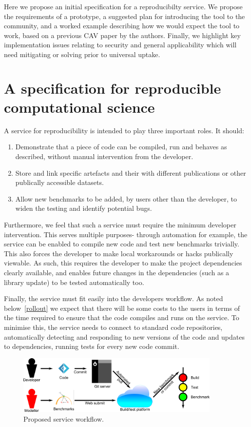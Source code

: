 \documentclass{llncs}
\begin{document}
Here we propose an initial specification for a reproducibilty service. We propose the
requirements of a prototype, a suggested plan for introducing the tool to the community,
and a worked example describing how we would expect the tool to work, based on a previous
CAV paper by the authors. Finally, we highlight key implementation issues relating to
security and general applicability which will need mitigating or solving prior to universal
uptake.

\section{A specification for reproducible computational science}\label{spec}

A service for reproducibility is intended to play three important roles. It should:
\begin{enumerate}
	\item Demonstrate that a piece of code can be compiled, run and behaves as described,
		without manual intervention from the developer.
	\item Store and link specific artefacts and their with different publications
		or other publically accessible datasets.
	\item Allow new benchmarks to be added, by users other than the developer, to 
		widen the testing and identify potential bugs.
\end{enumerate}
 
Furthermore, we feel that such a service must require the minimum developer intervention.
This serves multiple purposes- through automation for example, the service can be enabled to compile 
new code and test new benchmarks trivially. This also forces the developer to make local
workarounds or hacks publically viewable. As such, this requires the developer to make the 
project dependencies clearly available, and enables future changes in the dependencies 
(such as a library update) to be tested automatically too. 

Finally, the service must fit easily into the developers workflow. As noted below~\ref{rollout}
we expect that there will be some costs to the users in terms of the time required
to ensure that the code compiles and runs on the service. To minimise this, the service
needs to connect to standard code repositories, automatically detecting and responding to
new versions of the code and updates to dependencies, running tests for every new code commit.

\begin{figure}[h!]
	\centering
	\includegraphics[width=0.9\textwidth]{workflow}
	\caption{Proposed service workflow.}
	\label{schematic}
\end{figure}
	
\end{document}
